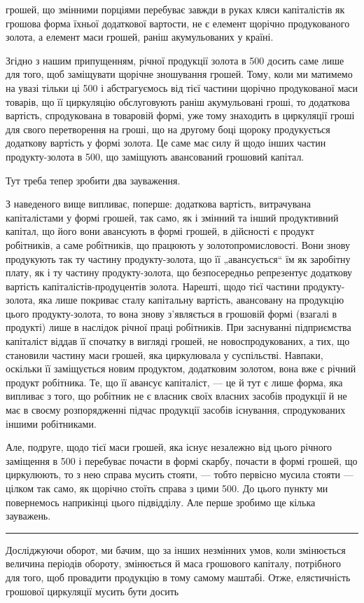 \parcont{}  %
грошей, що змінними порціями перебуває завжди в руках кляси капіталістів
як грошова форма їхньої додаткової вартости, не є елемент
щорічно продукованого золота, а елемент маси грошей, раніш акумульованих
у країні.

Згідно з нашим припущенням, річної продукції золота в 500
досить саме лише для того, щоб заміщувати щорічне зношування грошей.
Тому, коли ми матимемо на увазі тільки ці 500 і абстрагуємось
від тієї частини щорічно продукованої маси товарів, що її циркуляцію
обслуговують раніш акумульовані гроші, то додаткова вартість, спродукована
в товаровій формі, уже тому знаходить в циркуляції гроші для
свого перетворення на гроші, що на другому боці щороку продукується
додаткову вартість у формі золота. Це саме має силу й щодо інших частин
продукту-золота в 500, що заміщують авансований грошовий
капітал.

Тут треба тепер зробити два зауваження.

\enlargethispage{\baselineskip}
З наведеного вище випливає, поперше: додаткова вартість, витрачувана
капіталістами у формі грошей, так само, як і змінний та інший
продуктивний капітал, що його вони авансують в формі грошей, в
дійсності є продукт робітників, а саме робітників, що працюють у
золотопромисловості. Вони знову продукують так ту частину продукту-золота,
що її „авансується“ їм як заробітну плату, як і ту частину
продукту-золота, що безпосередньо репрезентує додаткову вартість
капіталістів-продуцентів золота. Нарешті, щодо тієї частини продукту-золота,
яка лише покриває сталу капітальну вартість, авансовану на
продукцію цього продукту-золота, то вона знову з’являється в грошовій
формі (взагалі в продукті) лише в наслідок річної праці робітників.
При заснуванні підприємства капіталіст віддав її спочатку в вигляді
грошей, не новоспродукованих, а тих, що становили частину маси грошей,
яка циркулювала у суспільстві. Навпаки, оскільки її заміщується новим
продуктом, додатковим золотом, вона вже є річний продукт робітника.
Те, що її авансує капіталіст, — це й тут є лише форма, яка випливає з
того, що робітник не є власник своїх власних засобів продукції й не
має в своєму розпорядженні підчас продукції засобів існування, спродукованих
іншими робітниками.

Але, подруге, щодо тієї маси грошей, яка існує незалежно від цього
річного заміщення в 500 і перебуває почасти в формі скарбу,
почасти в формі грошей, що циркулюють, то з нею справа мусить
стояти, — тобто первісно мусила стояти — цілком так само, як щорічно
стоїть справа з цими 500. До цього пункту ми повернемось
наприкінці цього підвідділу. Але перше зробимо ще кілька зауважень.

\plainbreak{2}

Досліджуючи оборот, ми бачим, що за інших незмінних умов, коли
змінюється величина періодів обороту, змінюється й маса грошового
капіталу, потрібного для того, щоб провадити продукцію в тому самому
маштабі. Отже, елястичність грошової циркуляції мусить бути досить
\parbreak{}  %
